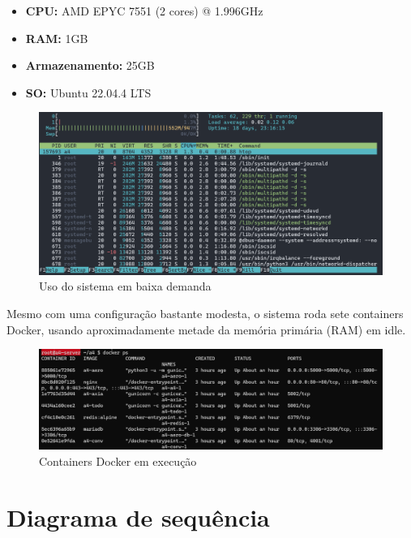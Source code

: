 \begin{itemize}
    \item \textbf{CPU:} AMD EPYC 7551 (2 cores) @ 1.996GHz
    \item \textbf{RAM:} 1GB
    \item \textbf{Armazenamento:} 25GB
    \item \textbf{SO:} Ubuntu 22.04.4 LTS
\end{itemize}

\begin{figure}[ht]
    \begin{center}
    \includegraphics[width=400pt]{img/prod-idle.png}
    \caption{Uso do sistema em baixa demanda}
    \label{fig:prod-idle}
    \end{center}
\end{figure}

Mesmo com uma configuração bastante modesta, o sistema roda sete containers Docker, usando 
aproximadamente metade da memória primária (RAM) em idle.

\begin{figure}[ht]
    \begin{center}
    \includegraphics[width=400pt]{img/containers.png}
    \caption{Containers Docker em execução}
    \label{fig:containers}
    \end{center}
\end{figure}

\section{Diagrama de sequência}


